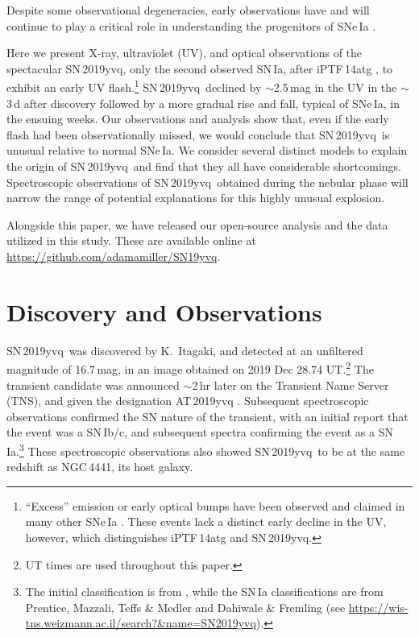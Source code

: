 \documentclass[twocolumn]{aastex63}
\newcommand{\sn}{SN\,2019yvq}
\begin{document}
Despite some observational degeneracies, early observations have and will
continue to play a critical role in understanding the progenitors of SNe\,Ia
\citep[e.g., early photometry of SN\,2011fe constrained the size of the
exploding star to be $\lesssim 0.02$\,$R_\odot$, providing the most direct
evidence to date that SNe\,Ia come from WDs;][]{Bloom12a}.

Here we present X-ray, ultraviolet (UV), and optical observations of the
spectacular \sn, only the second observed SN\,Ia, after iPTF\,14atg
\citep{Cao15}, to exhibit an early UV flash.\footnote{``Excess'' emission or
early optical bumps have been observed and claimed in many other SNe\,Ia
\citep[e.g.,][]{Goobar15,Marion16,Hosseinzadeh17,Jiang17,Shappee19,
Dimitriadis19}. These events lack a distinct early decline in the UV, however,
which distinguishes iPTF\,14atg and \sn.} \sn\ declined by $\sim$2.5\,mag in
the UV in the $\sim$3\,d after discovery followed by a more gradual rise and
fall, typical of SNe\,Ia, in the ensuing weeks. Our observations and analysis
show that, even if the early flash had been observationally missed, we would
conclude that \sn\ is unusual relative to normal SNe\,Ia. We consider several
distinct models to explain the origin of \sn\ and find that they all have
considerable shortcomings. Spectroscopic observations of \sn\ obtained during
the nebular phase will narrow the range of potential explanations for this
highly unusual explosion.

Alongside this paper, we have released our open-source analysis and the data
utilized in this study. These are available online at
\href{https://github.com/adamamiller/SN19yvq}{\url{https://github.com/adamamiller/SN19yvq}}.

\section{Discovery and Observations}\label{sec:obs}

\sn\ was discovered by K.~Itagaki, and detected at an unfiltered magnitude
of 16.7\,mag, in an image obtained on 2019 Dec 28.74 UT.\footnote{UT times
are used throughout this paper.} The transient candidate was announced
$\sim$2\,hr later on the Transient Name Server (TNS), and given the
designation AT\,2019yvq \citep{Itagaki19}. Subsequent spectroscopic
observations confirmed the SN nature of the transient, with an initial
report that the event was a SN\,Ib/c, and subsequent spectra confirming the
event as a SN\,Ia.\footnote{The initial classification is from
\citet{Kawabata20}, while the SN\,Ia classifications are from Prentice,
Mazzali, Teffs \& Medler and Dahiwale \& Fremling (see
\url{https://wis-tns.weizmann.ac.il/search?&name=SN2019yvq}).} These
spectroscopic observations also showed \sn\ to be at the same redshift as
NGC\,4441, its host galaxy.
\end{document}
